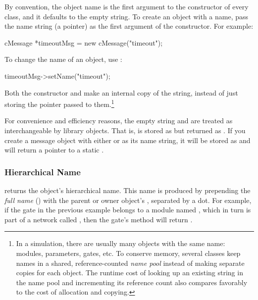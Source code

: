 By convention, the object name is the first argument to the constructor
of every class, and it defaults to the empty string. To create an object with
a name, pass the name string (a  pointer) as the first
argument of the constructor. For example:

\begin{cpp}
cMessage *timeoutMsg = new cMessage("timeout");
\end{cpp}

To change the name of an object, use :

\begin{cpp}
timeoutMsg->setName("timeout");
\end{cpp}

Both the constructor and  make an internal copy of the string,
instead of just storing the pointer passed to them.\footnote{
  In a simulation, there are usually many objects with the same name:
  modules, parameters, gates, etc. To conserve memory, several classes
  keep names in a shared, reference-counted \textit{name pool} instead of
  making separate copies for each object. The runtime cost of looking up an
  existing string in the name pool and incrementing its reference count
  also compares favorably to the cost of allocation and copying.}

For convenience and efficiency reasons, the empty string 
and  are treated as interchangeable by library objects.
That is,  is stored as  but returned as .
If you create a message object with either 
or  as its name string, it will be stored as 
and  will return a pointer to a static .


\subsubsection{Hierarchical Name}
\label{sec:sim-lib:object-fullpath}

 returns the object's hierarchical name. This name is
produced by prepending the \textit{full name} () with
the parent or owner object's , separated by a dot. For
example, if the  gate in the previous example belongs to a
module named , which in turn is part of a network called
, then the gate's  method will return
.

